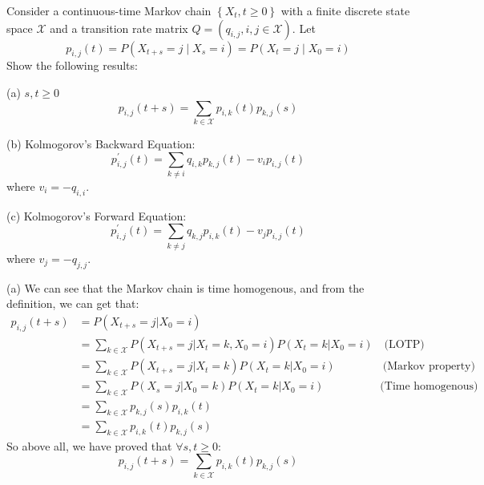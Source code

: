\begin{homeworkProblem}

Consider a continuous-time Markov chain $\left\{X_t, t \geq 0\right\}$ with a finite discrete state space $\mathcal{X}$ and a transition rate matrix $Q=\left(q_{i, j}, i, j \in \mathcal{X}\right)$. Let
$$p_{i, j}(t)=P\left(X_{t+s}=j \mid X_s=i\right)=P\left(X_t=j \mid X_0=i\right)$$
Show the following results:

(a) $s, t \geq 0$
$$p_{i, j}(t+s)=\sum_{k \in \mathcal{X}} p_{i, k}(t) p_{k, j}(s)$$

(b) Kolmogorov's Backward Equation:
$$p_{i, j}^{\prime}(t)=\sum_{k \neq i} q_{i, k} p_{k, j}(t)-v_i p_{i, j}(t)$$
where $v_i=-q_{i, i}$.

(c) Kolmogorov's Forward Equation:
$$p_{i, j}^{\prime}(t)=\sum_{k \neq j} q_{k, j} p_{i, k}(t)-v_j p_{i, j}(t)$$
where $v_j=-q_{j, j}$.

\solution

(a) We can see that the Markov chain is time homogenous, and from the definition, we can get that:
\begin{align*}
p_{i,j}(t+s) &= P(X_{t+s}=j|X_0=i) \\
&= \sum_{k\in\mathcal{X}} P(X_{t+s}=j|X_{t}=k, X_0=i)P(X_{t}=k|X_0=i) \quad\text{(LOTP)} \\
&= \sum_{k\in\mathcal{X}} P(X_{t+s}=j|X_{t}=k)P(X_{t}=k|X_0=i) \qquad\qquad\ \text{(Markov property)} \\
&= \sum_{k\in\mathcal{X}} P(X_{s}=j|X_{0}=k)P(X_{t}=k|X_0=i) \qquad\qquad\quad \text{(Time homogenous)} \\
&= \sum_{k\in\mathcal{X}} p_{k,j}(s)p_{i,k}(t) \\
&= \sum_{k\in\mathcal{X}} p_{i,k}(t)p_{k,j}(s)
\end{align*}
So above all, we have proved that $\forall s,t\geq 0$:
$$p_{i,j}(t+s)=\sum_{k\in\mathcal{X}} p_{i,k}(t)p_{k,j}(s)$$


\end{homeworkProblem}
